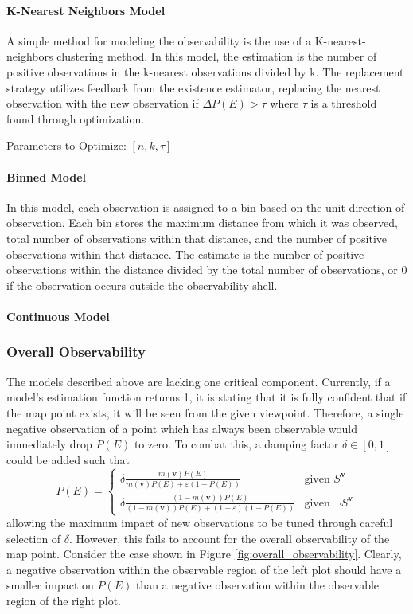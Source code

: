 \paragraph{K-Nearest Neighbors Model}

A simple method for modeling the observability is the use of a K-nearest-neighbors clustering method. In this model, the estimation is the number of positive observations in the k-nearest observations divided by k. The replacement strategy utilizes feedback from the existence estimator, replacing the nearest observation with the new observation if $\Delta P(E) > \tau$ where $\tau$ is a threshold found through optimization.

Parameters to Optimize: $[n, k, \tau]$

\paragraph{Binned Model}

In this model, each observation is assigned to a bin based on the unit direction of observation. Each bin stores the maximum distance from which it was observed, total number of observations within that distance, and the number of positive observations within that distance. The estimate is the number of positive observations within the distance divided by the total number of observations, or 0 if the observation occurs outside the observability shell.

\paragraph{Continuous Model}

\subsubsection{Overall Observability}

The models described above are lacking one critical component. Currently, if a model's estimation function returns 1, it is stating that it is fully confident that if the map point exists, it will be seen from the given viewpoint. Therefore, a single negative observation of a point which has always been observable would immediately drop $P(E)$ to zero. To combat this, a damping factor $\delta \in [0,1]$ could be added such that
\[
    P(E) = \begin{cases}
        \delta \frac{m(\boldsymbol{v})P(E)}{m(\boldsymbol{v})P(E) + \varepsilon(1-P(E))}             & \text{given }S^{\boldsymbol{v}}      \\
        \delta \frac{(1-m(\boldsymbol{v}))P(E)}{(1-m(\boldsymbol{v}))P(E) + (1-\varepsilon)(1-P(E))} & \text{given }\neg S^{\boldsymbol{v}}
    \end{cases}
\]
allowing the maximum impact of new observations to be tuned through careful selection of $\delta$. However, this fails to account for the overall observability of the map point. Consider the case shown in Figure \ref{fig:overall_observability}. Clearly, a negative observation within the observable region of the left plot should have a smaller impact on $P(E)$ than a negative observation within the observable region of the right plot.


